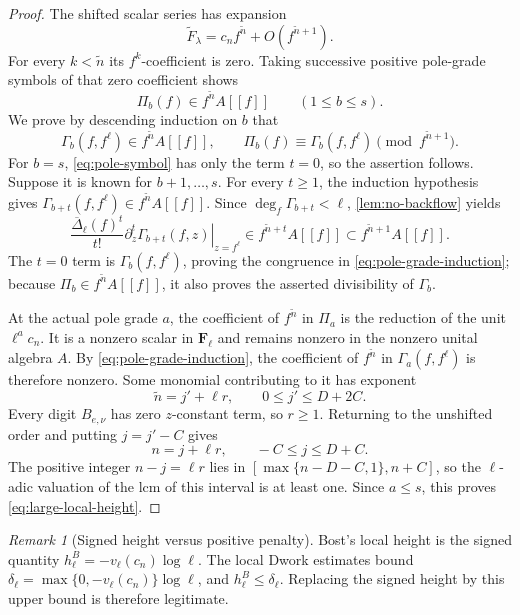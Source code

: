 \documentclass[11pt]{article}
\theoremstyle{definition}
\theoremstyle{remark}
\newtheorem{remark}[remark]{Remark}
\newcommand{\F}{\mathbf F}
\begin{document}
\begin{proof}
The shifted scalar series has expansion
\[
 \widetilde F_\lambda
 =c_nf^{\widetilde n}+O(f^{\widetilde n+1}).
\]
For every $k<\widetilde n$ its $f^k$-coefficient is zero.  Taking successive
positive pole-grade symbols of that zero coefficient shows
\[
 \Pi_b(f)\in f^{\widetilde n}A[[f]]
 \qquad(1\le b\le s).
\]
We prove by descending induction on $b$ that
\begin{equation}\label{eq:pole-grade-induction}
 \Gamma_b(f,f^\ell)\in f^{\widetilde n}A[[f]],
 \qquad
 \Pi_b(f)\equiv\Gamma_b(f,f^\ell)
 \pmod{f^{\widetilde n+1}}.
\end{equation}
For $b=s$, \eqref{eq:pole-symbol} has only the term $t=0$, so the assertion
follows.  Suppose it is known for $b+1,\ldots,s$.  For every $t\ge1$, the
induction hypothesis gives
$\Gamma_{b+t}(f,f^\ell)\in f^{\widetilde n}A[[f]]$.  Since
$\deg_f\Gamma_{b+t}<\ell$, \cref{lem:no-backflow} yields
\[
 \frac{\overline\Delta_\ell(f)^t}{t!}
 \left.\partial_z^t\Gamma_{b+t}(f,z)\right|_{z=f^\ell}
 \in f^{\widetilde n+t}A[[f]]
 \subset f^{\widetilde n+1}A[[f]].
\]
The $t=0$ term is $\Gamma_b(f,f^\ell)$, proving the congruence in
\eqref{eq:pole-grade-induction}; because $\Pi_b\in f^{\widetilde n}A[[f]]$,
it also proves the asserted divisibility of $\Gamma_b$.

At the actual pole grade $a$, the coefficient of $f^{\widetilde n}$ in
$\Pi_a$ is the reduction of the unit $\ell^ac_n$.  It is a nonzero scalar in
$\F_\ell$ and remains nonzero in the nonzero unital algebra $A$.  By
\eqref{eq:pole-grade-induction}, the coefficient of $f^{\widetilde n}$ in
$\Gamma_a(f,f^\ell)$ is therefore nonzero.  Some monomial contributing to it
has exponent
\[
 \widetilde n=j'+\ell r,
 \qquad 0\le j'\le D+2C.
\]
Every digit $B_{e,\nu}$ has zero $z$-constant term, so $r\ge1$.  Returning to
the unshifted order and putting $j=j'-C$ gives
\[
 n=j+\ell r,
 \qquad -C\le j\le D+C.
\]
The positive integer $n-j=\ell r$ lies in
$[\max\{n-D-C,1\},n+C]$, so the $\ell$-adic valuation of the lcm of this
interval is at least one.  Since $a\le s$, this proves
\eqref{eq:large-local-height}.
\end{proof}

\begin{remark}[Signed height versus positive penalty]
Bost's local height is the signed quantity
$h^B_\ell=-v_\ell(c_n)\log\ell$.  The local Dwork estimates bound
$\delta_\ell=\max\{0,-v_\ell(c_n)\}\log\ell$, and
$h^B_\ell\le\delta_\ell$.  Replacing the signed height by this upper bound is
therefore legitimate.
\end{remark}
\end{document}
